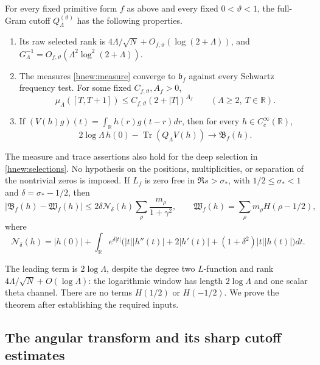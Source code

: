 \begin{theorem}
\label{hnew:theorem}
For every fixed primitive form $f$ as above and every fixed
$0<\vartheta<1$, the full-Gram cutoff
$Q_\Lambda^{(\vartheta)}$ has the following properties.
\begin{enumerate}
\item Its raw selected rank is
$4\Lambda/\sqrt N+O_{f,\vartheta}(\log(2+\Lambda))$, and
$G_\Lambda^{-1}=O_{f,\vartheta}(\Lambda^2\log^2(2+\Lambda))$.
\item The measures \eqref{hnew:measure} converge to $\mathfrak b_f$
against every Schwartz frequency test.  For some fixed $C_{f,\vartheta},A_f>0$,
\[
 \mu_\Lambda([T,T+1])\le C_{f,\vartheta}(2+|T|)^{A_f}
       \qquad(\Lambda\ge2,\ T\in\mathbb R).
\]
\item If $(V(h)g)(t)=\int_{\mathbb R}h(r)g(t-r)dr$, then for
every $h\in C_c^\infty(\mathbb R)$,
\begin{equation}\label{hnew:trace-theorem}
 2\log\Lambda\,h(0)-\operatorname{Tr}(Q_\Lambda V(h))
             \longrightarrow\mathfrak B_f(h).
\end{equation}
\end{enumerate}
The measure and trace assertions also hold for the deep selection
in \eqref{hnew:selections}.  No hypothesis on the positions,
multiplicities, or separation of the nontrivial zeros is imposed.
If $L_f$ is zero free in $\Re s>\sigma_*$, with
$1/2\le\sigma_*<1$ and $\delta=\sigma_*-1/2$, then
\[
 |\mathfrak B_f(h)-\mathfrak W_f(h)|
 \le2\delta\mathcal N_\delta(h)
           \sum_\rho\frac{m_\rho}{1+\gamma^2},\qquad
 \mathfrak W_f(h)=\sum_\rho m_\rho H(\rho-1/2),
\]
where
\[
 \mathcal N_\delta(h)=|h(0)|+
 \int_{\mathbb R}e^{\delta|t|}
 \bigl(|t||h''(t)|+2|h'(t)|+(1+\delta^2)|t||h(t)|\bigr)dt.
\]
\end{theorem}

The leading term is $2\log\Lambda$, despite the degree two
$L$-function and rank $4\Lambda/\sqrt N+O(\log\Lambda)$: the logarithmic
window has length $2\log\Lambda$ and one scalar theta channel.
There are no terms $H(1/2)$ or $H(-1/2)$.
We prove the theorem after establishing the required inputs.

\subsection{The angular transform and its sharp cutoff estimates}

